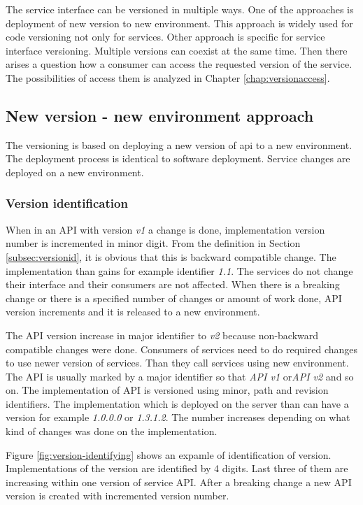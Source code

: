 The service interface can be versioned in multiple ways. One of the approaches is deployment of new version to new environment. This approach is widely used for code versioning not only for services. Other approach is specific for service interface versioning. Multiple versions can coexist at the same time. Then there arises a question how a consumer can access the requested version of the service. The possibilities of access them is analyzed in Chapter \ref{chap:versionaccess}.


\subsection{New version - new environment approach}

The versioning is based on deploying a new version of \gls{api} to a new environment. The deployment process is identical to software deployment. Service changes are deployed on a new environment. %

\subsubsection{Version identification}
When in an API with version \emph{v1} a change is done, implementation version number is incremented in minor digit. From the definition in Section \ref{subsec:versionid}, it is obvious that this is backward compatible change. The implementation than gains for example identifier \emph{1.1}. The services do not change their interface and their consumers are not affected. 
When there is a breaking change or there is a specified number of changes or amount of work done, API version increments and it is released to a new environment. 

The API version increase in major identifier to \emph{v2} because non-backward compatible changes were done. Consumers of services need to do required changes to use newer version of services. Than they call services using new environment. 
The API is usually marked by a major identifier so that \emph{API v1} or\emph{API v2} and so on.
The implementation of API is versioned using minor, path and revision identifiers. The implementation which is deployed on the server than can have a version for example \emph{1.0.0.0} or \emph{1.3.1.2}. The number increases depending on what kind of changes was done on the implementation.

Figure \ref{fig:version-identifying} shows an expamle of identification of version. Implementations of the version are identified by 4 digits. Last three of them are increasing within one version of service API. After a breaking change a new API version is created with incremented version number. 

